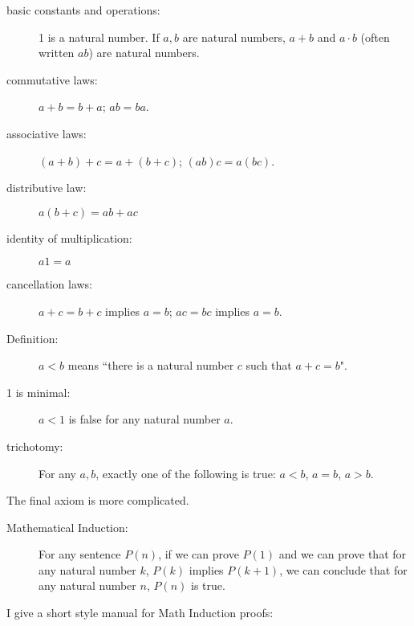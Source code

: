 \documentclass[12pt]{article}
\begin{document}
\begin{description}

\item[basic constants and operations:]  1 is a natural number.  If $a,b$ are natural numbers, $a+b$ and $a\cdot b$ (often written $ab$) are natural numbers.

\item[commutative laws:]  $a+b=b+a$; $ab=ba$. 

\item[associative laws:]  $(a+b)+c=a+(b+c)$;  $(ab)c=a(bc)$.

\item[distributive law:]  $a(b+c)=ab+ac$

\item[identity of multiplication:]  $a1=a$

\item[cancellation laws:]  $a+c=b+c$ implies $a=b$;  $ac=bc$ implies $a=b$.

\item[Definition:]  $a<b$ means ``there is a natural number $c$ such that $a+c=b$".

\item[1 is minimal:]  $a<1$ is false for any natural number $a$.

\item[trichotomy:]  For any $a,b$, exactly one of the following is true:  $a<b$, $a=b$, $a>b$.

\end{description}

The final axiom is more complicated.

\begin{description}

\item[Mathematical Induction:]  For any sentence $P(n)$, if we can prove $P(1)$ and we can prove that for
any natural number $k$, $P(k)$ implies $P(k+1)$, we can conclude that for any natural number $n$, $P(n)$ is true.

\end{description}

\newpage

I give a short style manual for Math Induction proofs:
\end{document}
